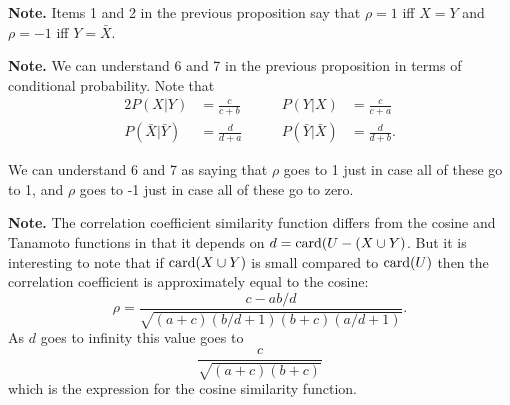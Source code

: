 \documentclass{article}
\newcommand{\skipsmall}{\vspace{1em}}
\begin{document}
\textbf{Note.} Items 1 and 2 in the previous proposition say that $\rho=1$ iff $X=Y$
and $\rho=-1$ iff $Y=\bar{X}$.

\skipsmall

\textbf{Note.} We can understand 6 and 7 in the previous proposition in terms of
conditional probability. Note that
\begin{alignat}{2}
P(X | Y) &= \frac{c}{c+b} &\qquad P(Y | X) &= \frac{c}{c+a} \\
P(\bar{X} | \bar{Y}) &= \frac{d}{d+a} &\qquad P(\bar{Y} | \bar{X}) &=
\frac{d}{d+b}.
\end{alignat}

We can understand 6 and 7 as saying that $\rho$ goes to 1 just in case all of
these go to 1, and $\rho$ goes to -1 just in case all of these go to zero.

\skipsmall

\textbf{Note.} The correlation coefficient similarity function differs from the
cosine and Tanamoto functions in that it depends on $d = \operatorname{card}(U - (X\cup Y)$.
But it is interesting to note that if $\operatorname{card}(X\cup Y)$ is small compared to
$\operatorname{card}(U)$ then the correlation coefficient is approximately equal to the
cosine:
\begin{equation}
\rho=\frac{c-ab/d}{\sqrt{(a+c)(b/d+1)(b+c)(a/d+1)}}.
\end{equation}
As $d$ goes to infinity this value goes to
\begin{equation}
\frac{c}{\sqrt{(a+c)(b+c)}}
\end{equation}
which is the expression for the cosine similarity function.
\end{document}
